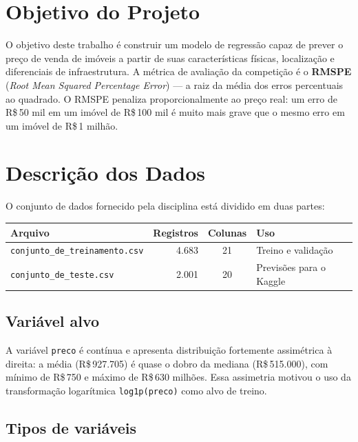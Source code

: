 \documentclass[12pt,a4paper]{article}
\begin{document}
\section{Objetivo do Projeto}

O objetivo deste trabalho é construir um modelo de regressão capaz de prever o preço de venda de imóveis a partir de suas características físicas, localização e diferenciais de infraestrutura. A métrica de avaliação da competição é o \textbf{RMSPE} (\textit{Root Mean Squared Percentage Error}) --- a raiz da média dos erros percentuais ao quadrado. O RMSPE penaliza proporcionalmente ao preço real: um erro de R\$\,50 mil em um imóvel de R\$\,100 mil é muito mais grave que o mesmo erro em um imóvel de R\$\,1 milhão.

\section{Descrição dos Dados}

O conjunto de dados fornecido pela disciplina está dividido em duas partes:

\begin{table}[h]
\centering
\begin{tabular}{lrcl}
\toprule
\textbf{Arquivo} & \textbf{Registros} & \textbf{Colunas} & \textbf{Uso} \\
\midrule
\texttt{conjunto\_de\_treinamento.csv} & 4.683 & 21 & Treino e validação \\
\texttt{conjunto\_de\_teste.csv}       & 2.001 & 20 & Previsões para o Kaggle \\
\bottomrule
\end{tabular}
\end{table}

\subsection{Variável alvo}

A variável \texttt{preco} é contínua e apresenta distribuição fortemente assimétrica à direita: a média (R\$\,927.705) é quase o dobro da mediana (R\$\,515.000), com mínimo de R\$\,750 e máximo de R\$\,630 milhões. Essa assimetria motivou o uso da transformação logarítmica \lstinline{log1p(preco)} como alvo de treino.

\subsection{Tipos de variáveis}
\end{document}
